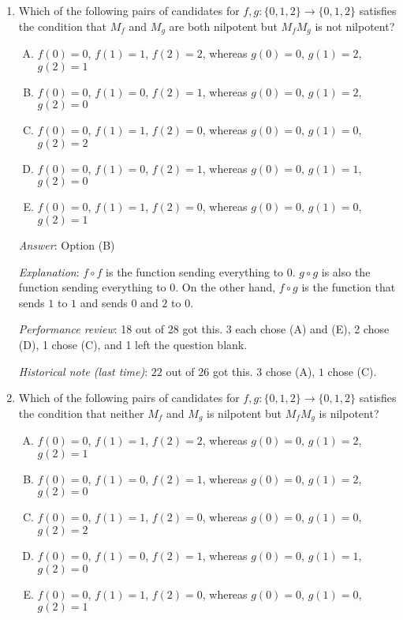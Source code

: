 \documentclass[10pt]{amsart}
\begin{document}
\begin{enumerate}
  {\em Performance review}: 17 out of 28 got this. 5 chose (E), 2 each
  chose (A), (B), and (C).

  {\em Historical note (last time)}: $20$ out of $26$ got this. $2$
  each chose (A), (B), and (E).
\item Which of the following pairs of candidates for $f,g: \{ 0,1,2 \}
  \to \{ 0,1,2 \}$ satisfies the condition that $M_f$ and $M_g$ are
  both nilpotent but $M_fM_g$ is not nilpotent?

  \begin{enumerate}[(A)]
  \item $f(0) = 0$, $f(1) = 1$, $f(2) = 2$, whereas $g(0) = 0$, $g(1)
    = 2$, $g(2) = 1$
  \item $f(0) = 0$, $f(1) = 0$, $f(2) = 1$, whereas $g(0) = 0$, $g(1)
    = 2$, $g(2) = 0$
  \item $f(0) = 0$, $f(1) = 1$, $f(2) = 0$, whereas $g(0) = 0$, $g(1)
    = 0$, $g(2) = 2$
  \item $f(0) = 0$, $f(1) = 0$, $f(2) = 1$, whereas $g(0) = 0$, $g(1)
    = 1$, $g(2) = 0$
  \item $f(0) = 0$, $f(1) = 1$, $f(2) = 0$, whereas $g(0) = 0$, $g(1)
    = 0$, $g(2) = 1$
  \end{enumerate}

  {\em Answer}: Option (B)

  {\em Explanation}: $f \circ f$ is the function sending everything to
  $0$. $g \circ g$ is also the function sending everything to $0$. On
  the other hand, $f \circ g$ is the function that sends $1$ to $1$
  and sends $0$ and $2$ to $0$.

  {\em Performance review}: 18 out of 28 got this. 3 each chose (A)
  and (E), 2 chose (D), 1 chose (C), and 1 left the question blank.

  {\em Historical note (last time)}: $22$ out of $26$ got this. $3$
  chose (A), $1$ chose (C).
\item Which of the following pairs of candidates for $f,g: \{ 0,1,2 \}
  \to \{ 0,1,2 \}$ satisfies the condition that neither $M_f$ and
  $M_g$ is nilpotent but $M_fM_g$ is nilpotent?

  \begin{enumerate}[(A)]
  \item $f(0) = 0$, $f(1) = 1$, $f(2) = 2$, whereas $g(0) = 0$, $g(1)
    = 2$, $g(2) = 1$
  \item $f(0) = 0$, $f(1) = 0$, $f(2) = 1$, whereas $g(0) = 0$, $g(1)
    = 2$, $g(2) = 0$
  \item $f(0) = 0$, $f(1) = 1$, $f(2) = 0$, whereas $g(0) = 0$, $g(1)
    = 0$, $g(2) = 2$
  \item $f(0) = 0$, $f(1) = 0$, $f(2) = 1$, whereas $g(0) = 0$, $g(1)
    = 1$, $g(2) = 0$
  \item $f(0) = 0$, $f(1) = 1$, $f(2) = 0$, whereas $g(0) = 0$, $g(1)
    = 0$, $g(2) = 1$
  \end{enumerate}


\end{enumerate}
\end{document}
